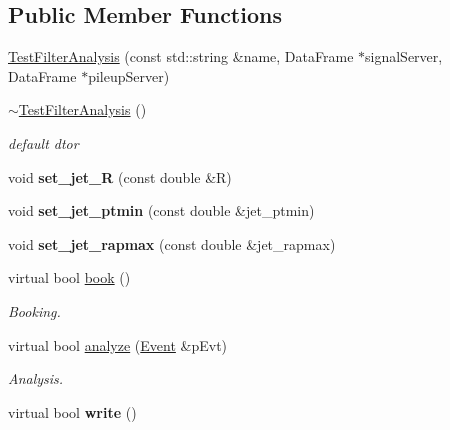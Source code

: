\subsection*{Public Member Functions}
\begin{CompactItemize}
\item 
\hyperlink{classTestFilterAnalysis_bb1cf1c6fbaf2180127d4470222f29a3}{Test\-Filter\-Analysis} (const std::string \&name, Data\-Frame $\ast$signal\-Server, Data\-Frame $\ast$pileup\-Server)
\item 
\hypertarget{classTestFilterAnalysis_b009783e263973c31fc2978446313d60}{
\hyperlink{classTestFilterAnalysis_b009783e263973c31fc2978446313d60}{$\sim$Test\-Filter\-Analysis} ()}
\label{classTestFilterAnalysis_b009783e263973c31fc2978446313d60}

\begin{CompactList}\small\item\em default dtor \item\end{CompactList}\item 
\hypertarget{classTestFilterAnalysis_6df231616c53826df661537fef9f0da1}{
void \textbf{set\_\-jet\_\-R} (const double \&R)}
\label{classTestFilterAnalysis_6df231616c53826df661537fef9f0da1}

\item 
\hypertarget{classTestFilterAnalysis_a4a8feae5a120541b94aabecb700e6a4}{
void \textbf{set\_\-jet\_\-ptmin} (const double \&jet\_\-ptmin)}
\label{classTestFilterAnalysis_a4a8feae5a120541b94aabecb700e6a4}

\item 
\hypertarget{classTestFilterAnalysis_c7c5681b66a69d809f557816a533dddf}{
void \textbf{set\_\-jet\_\-rapmax} (const double \&jet\_\-rapmax)}
\label{classTestFilterAnalysis_c7c5681b66a69d809f557816a533dddf}

\item 
virtual bool \hyperlink{classTestFilterAnalysis_b277393b1e443de3c4f12e0c54a72694}{book} ()
\begin{CompactList}\small\item\em Booking. \item\end{CompactList}\item 
virtual bool \hyperlink{classTestFilterAnalysis_83c3094d993fde404e375cf272f4e5b1}{analyze} (\hyperlink{classEvent}{Event} \&p\-Evt)
\begin{CompactList}\small\item\em Analysis. \item\end{CompactList}\item 
\hypertarget{classTestFilterAnalysis_eca7955b05511b7e1b63470bc1343f03}{
virtual bool \textbf{write} ()}
\label{classTestFilterAnalysis_eca7955b05511b7e1b63470bc1343f03}

\end{CompactItemize}

